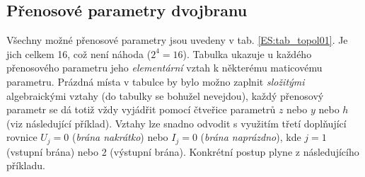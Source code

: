     \subsection{Přenosové parametry dvojbranu}\label{teo:IchapIIIsecIsubVIII}
      Všechny možné přenosové parametry jsou uvedeny v tab. \ref{ES:tab_topol01}. Je jich celkem 
      \num{16}, což není náhoda (\(2^4 = 16\)). Tabulka ukazuje u každého přenosového parametru 
      jeho \emph{elementární} vztah k některému maticovému parametru. Prázdná místa v tabulce by 
      bylo možno zaplnit \emph{složitými} algebraickými vztahy (do tabulky se bohužel nevejdou), 
      každý přenosový parametr se dá totiž vždy vyjádřit pomocí čtveřice parametrů \(z\) nebo \(y\) 
      nebo \(h\) (viz následující příklad). Vztahy lze snadno odvodit s využitím třetí doplňující 
      rovnice \(U_j = 0\) (\emph{brána nakrátko}) nebo \(I_j = 0\) (\emph{brána naprázdno}), kde 
      \(j = 1\) (vstupní brána) nebo \num{2} (výstupní brána). Konkrétní postup plyne z 
      následujícího příkladu.
